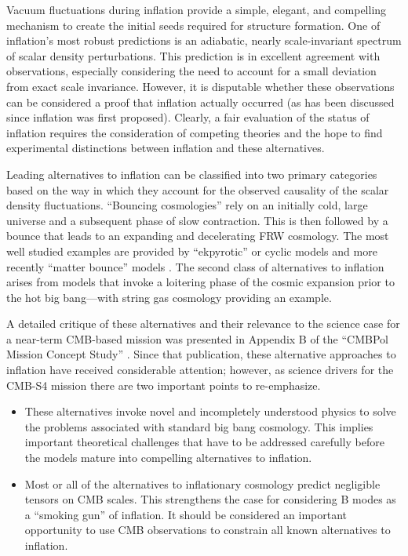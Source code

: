 Vacuum fluctuations during inflation provide a simple, elegant, and compelling mechanism to create the initial seeds required for structure formation. 
One of inflation's most robust predictions is an adiabatic, nearly
scale-invariant spectrum of scalar density perturbations.
This prediction is in excellent agreement with observations, especially
considering the need to account for a small deviation from exact scale
invariance.  However, it is disputable whether these observations can be
considered a proof that inflation actually occurred (as has been discussed
since inflation was first proposed).
Clearly, a fair evaluation of the status of inflation requires the
consideration of competing theories and the hope to find experimental distinctions between inflation and these alternatives.

Leading alternatives to inflation can be classified into two primary categories based on the 
way in which they account for the observed causality of the scalar density fluctuations.
``Bouncing cosmologies'' rely on an initially cold, large universe and a subsequent phase of
slow contraction. This is then followed by a bounce that leads
to an expanding and decelerating FRW cosmology.  The most well studied examples are provided by 
``ekpyrotic'' or cyclic models \cite{Khoury:2001bz,Khoury:2001wf}
and more recently ``matter bounce'' models \cite{Brandenberger:2012zb,Cai:2014jla,deHaro:2015wda}.
The second class of alternatives to inflation arises from models that invoke a loitering phase of the cosmic expansion prior to the hot big bang---with 
string gas cosmology \cite{Brandenberger:1988aj,Tseytlin:1991xk,Battefeld:2005av} providing an example. 

A detailed critique of these alternatives and their relevance to the science case for a
near-term CMB-based mission was presented in Appendix B of the ``CMBPol
Mission Concept Study'' \cite{Baumann:2008aq}.  
Since that publication, these alternative approaches to inflation have received considerable attention;
however, as science drivers for the CMB-S4 mission there are two important points to re-emphasize.
\begin{itemize}
\item These alternatives invoke novel and incompletely understood physics to solve the problems associated with standard big bang cosmology.  This implies important theoretical challenges that have to be addressed carefully before the models mature into compelling alternatives to inflation.

\item Most or all of the alternatives to inflationary cosmology predict negligible tensors on CMB scales.
This strengthens the case for considering B modes as a ``smoking gun'' of inflation.  It should be considered an important
opportunity to use CMB observations to constrain all known alternatives to inflation.
\end{itemize}

